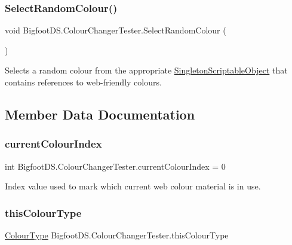 \subsubsection{\texorpdfstring{Select\+Random\+Colour()}{SelectRandomColour()}}
{\footnotesize\ttfamily void Bigfoot\+D\+S.\+Colour\+Changer\+Tester.\+Select\+Random\+Colour (\begin{DoxyParamCaption}{ }\end{DoxyParamCaption})}



Selects a random colour from the appropriate \mbox{\hyperlink{class_singleton_scriptable_object}{Singleton\+Scriptable\+Object}} that contains references to web-\/friendly colours. 



\subsection{Member Data Documentation}
\mbox{\label{class_bigfoot_d_s_1_1_colour_changer_tester_aa4dfb28508c536b6aeb95261415c64a6}} 
\subsubsection{\texorpdfstring{current\+Colour\+Index}{currentColourIndex}}
{\footnotesize\ttfamily int Bigfoot\+D\+S.\+Colour\+Changer\+Tester.\+current\+Colour\+Index = 0}



Index value used to mark which current web colour material is in use. 

\mbox{\label{class_bigfoot_d_s_1_1_colour_changer_tester_ab7fcdc500194580a3d2881be60ba2079}} 
\subsubsection{\texorpdfstring{this\+Colour\+Type}{thisColourType}}
{\footnotesize\ttfamily \mbox{\hyperlink{namespace_bigfoot_d_s_abbe5e74a13ceee1200fe8df86775491b}{Colour\+Type}} Bigfoot\+D\+S.\+Colour\+Changer\+Tester.\+this\+Colour\+Type}



